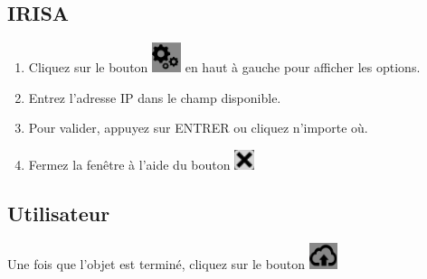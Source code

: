 \documentclass[a4paper,11pt]{article}
\begin{document}
	\subsection{IRISA}
		\begin{enumerate}
		\item Cliquez sur le bouton \includegraphics[scale=0.7]{./images/engrenage.png} en haut à gauche pour afficher les options.
		
		\item Entrez l'adresse IP dans le champ disponible.
		
		\item Pour valider, appuyez sur ENTRER ou cliquez n'importe où.
		
		\item Fermez la fenêtre à l'aide du bouton \includegraphics{./images/closewindow.png}
		\end{enumerate}
	\subsection{Utilisateur}
			Une fois que l'objet est terminé, cliquez sur le bouton \includegraphics[scale=0.8]{./images/export.png}
		
\end{document}
